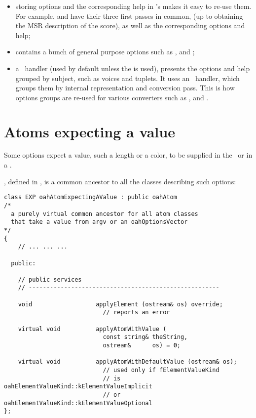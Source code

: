 \begin{itemize}
\item storing options and the corresponding help in 's makes it easy to re-use them.
    For example,  and  have their three first passes in common,
    (up to obtaining the MSR description of the score),
    as well as the corresponding options and help;

\item {} contains a bunch of general purpose options
    such as ,  and ;

\item a \regular\ handler (used by default unless the  is used),
    presents the options and help grouped by subject, such as voices and tuplets.
    It uses an \insider\ handler, which groups them by internal representation
    and conversion pass.
    This is how options groups are re-used for various
    converters such as ,  and .

\end{itemize}


\section{Atoms expecting a value}

Some options expect a value, such a length or a color, to be supplied in the \CLI\ or in a .

, defined in , is a common ancestor to all the classes describing such options:
\begin{lstlisting}[language=CPlusPlus]
class EXP oahAtomExpectingAValue : public oahAtom
/*
  a purely virtual common ancestor for all atom classes
  that take a value from argv or an oahOptionsVector
*/
{
	// ... ... ...

  public:

    // public services
    // ------------------------------------------------------

    void                  applyElement (ostream& os) override;
                            // reports an error

    virtual void          applyAtomWithValue (
                            const string& theString,
                            ostream&      os) = 0;

    virtual void          applyAtomWithDefaultValue (ostream& os);
                            // used only if fElementValueKind
                            // is oahElementValueKind::kElementValueImplicit
                            // or oahElementValueKind::kElementValueOptional
};
\end{lstlisting}

